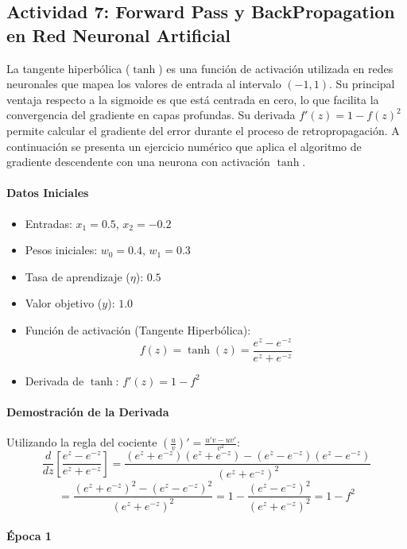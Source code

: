 \documentclass[12pt]{article}
\begin{document}
\subsection{Actividad 7: Forward Pass y BackPropagation en Red Neuronal Artificial}

La tangente hiperbólica ($\tanh$) es una función de activación utilizada en redes neuronales que mapea los valores de entrada al intervalo $(-1,1)$. Su principal ventaja respecto a la sigmoide es que está centrada en cero, lo que facilita la convergencia del gradiente en capas profundas. Su derivada $f'(z)=1-f(z)^2$ permite calcular el gradiente del error durante el proceso de retropropagación. A continuación se presenta un ejercicio numérico que aplica el algoritmo de gradiente descendente con una neurona con activación $\tanh$.

\paragraph{Datos Iniciales}
\begin{itemize}
    \item Entradas: $x_{1} = 0.5$, $x_{2} = -0.2$
    \item Pesos iniciales: $w_{0} = 0.4$, $w_{1} = 0.3$
    \item Tasa de aprendizaje ($\eta$): $0.5$
    \item Valor objetivo ($y$): $1.0$
    \item Función de activación (Tangente Hiperbólica): 
    \[ f(z) = \tanh(z) = \frac{e^{z}-e^{-z}}{e^{z}+e^{-z}} \]
    \item Derivada de $\tanh$: $f'(z) = 1 - f^2$
\end{itemize}

\paragraph{Demostración de la Derivada}
Utilizando la regla del cociente $\left(\frac{u}{v}\right)' = \frac{u'v - uv'}{v^2}$:
\[ \frac{d}{dz}\left[\frac{e^{z}-e^{-z}}{e^{z}+e^{-z}}\right] = \frac{(e^{z}+e^{-z})(e^{z}+e^{-z}) - (e^{z}-e^{-z})(e^{z}-e^{-z})}{(e^{z}+e^{-z})^2} \]
\[ = \frac{(e^{z}+e^{-z})^2 - (e^{z}-e^{-z})^2}{(e^{z}+e^{-z})^2} = 1 - \frac{(e^{z}-e^{-z})^2}{(e^{z}+e^{-z})^2} = 1 - f^2 \]

\paragraph{Época 1}
\end{document}
